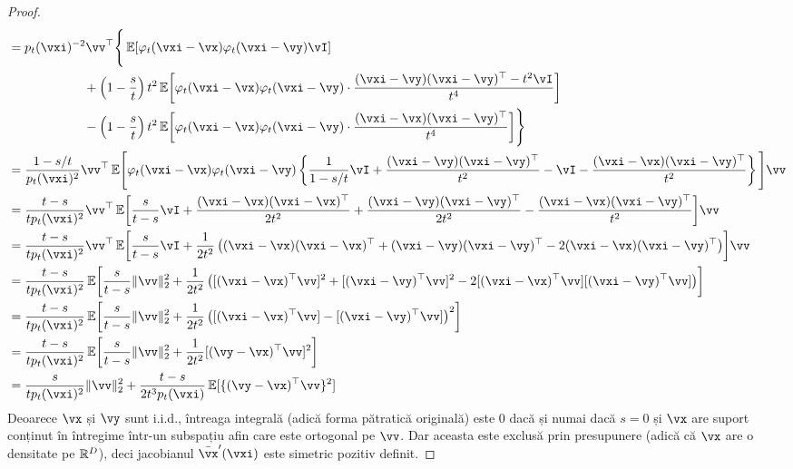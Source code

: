 \documentclass[../../book-main_ro.tex]{subfiles}
\begin{document}
\begin{proof}
\begin{align}
        &= p_{t}(\vxi)^{-2}\vv^{\top}\Bigg\{\Ex[\phi_{t}(\vxi - \vx)\phi_{t}(\vxi - \vy)\vI] \\
        & \qquad \qquad \qquad + \bp{1 - \frac{s}{t}}t^{2}\Ex\rs{\phi_{t}(\vxi - \vx)\phi_{t}(\vxi - \vy)\cdot\frac{(\vxi - \vy)(\vxi - \vy)^{\top} - t^{2}\vI}{t^{4}}} \\
        & \qquad \qquad \qquad -\bp{1 - \frac{s}{t}}t^{2}\Ex\rs{\phi_{t}(\vxi - \vx)\phi_{t}(\vxi - \vy)\cdot\frac{(\vxi - \vx)(\vxi - \vy)^{\top}}{t^{4}}}\Bigg\} \\ 
        &= \frac{1 - s/t}{p_{t}(\vxi)^{2}}\vv^{\top}\Ex\mathopen{}\Bigg[\phi_{t}(\vxi - \vx)\phi_{t}(\vxi - \vy)\bc{\frac{1}{1 - s/t}\vI + \frac{(\vxi - \vy)(\vxi - \vy)^{\top}}{t^{2}} - \vI - \frac{(\vxi - \vx)(\vxi - \vy)^{\top}}{t^{2}}}\Bigg]\vv \\
        &= \frac{t - s}{tp_{t}(\vxi)^{2}}\vv^{\top}\Ex\rs{\frac{s}{t - s}\vI +\frac{(\vxi - \vx)(\vxi - \vx)^{\top}}{2t^{2}} + \frac{(\vxi - \vy)(\vxi - \vy)^{\top}}{2t^{2}} - \frac{(\vxi - \vx)(\vxi - \vy)^{\top}}{t^{2}}}\vv \\
        &= \frac{t - s}{tp_{t}(\vxi)^{2}}\vv^{\top}\Ex\rs{\frac{s}{t - s}\vI +\frac{1}{2t^{2}}\bp{(\vxi - \vx)(\vxi - \vx)^{\top} + (\vxi - \vy)(\vxi - \vy)^{\top} - 2(\vxi - \vx)(\vxi - \vy)^{\top}}}\vv \\
        &= \frac{t - s}{tp_{t}(\vxi)^{2}}\Ex\rs{\frac{s}{t - s}\norm{\vv}_{2}^{2} +\frac{1}{2t^{2}}\bp{[(\vxi - \vx)^{\top}\vv]^{2} + [(\vxi - \vy)^{\top}\vv]^{2} - 2[(\vxi - \vx)^{\top}\vv][(\vxi - \vy)^{\top}\vv]}} \\
        &= \frac{t - s}{tp_{t}(\vxi)^{2}}\Ex\rs{\frac{s}{t - s}\norm{\vv}_{2}^{2} +\frac{1}{2t^{2}}\bp{[(\vxi - \vx)^{\top}\vv] - [(\vxi - \vy)^{\top}\vv]}^{2}} \\
        &= \frac{t - s}{tp_{t}(\vxi)^{2}}\Ex\rs{\frac{s}{t - s}\norm{\vv}_{2}^{2} +\frac{1}{2t^{2}}[(\vy - \vx)^{\top}\vv]^{2}} \\
        &= \frac{s}{tp_{t}(\vxi)^{2}}\norm{\vv}_{2}^{2} + \frac{t - s}{2t^{3}p_{t}(\vxi)}\Ex[\{(\vy - \vx)^{\top}\vv\}^{2}]
    \end{align}
    Deoarece \(\vx\) și \(\vy\) sunt i.i.d., întreaga integrală (adică forma pătratică originală) este \(0\) dacă și numai dacă \(s = 0\) și \(\vx\) are suport conținut în întregime într-un subspațiu afin care este ortogonal pe \(\vv\). Dar aceasta este exclusă prin presupunere (adică că \(\vx\) are o densitate pe \(\mathbb{R}^{D}\)), deci jacobianul \(\bar{\vx}^{\prime}(\vxi)\) este simetric pozitiv definit.
\end{proof}
\end{document}
